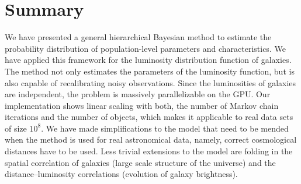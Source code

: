 \section{Summary}
\label{sec:summary} We have presented a general hierarchical Bayesian method to estimate the probability distribution of population-level parameters and characteristics.
We have applied this framework for the luminosity distribution function of galaxies.
The method not only estimates the parameters of the luminosity function, but is also capable of recalibrating noisy observations.
Since the luminosities of galaxies are independent, the problem is massively parallelizable on the GPU.
Our implementation shows linear scaling with both, the number of Markov chain iterations and the number of objects, which makes it applicable to real data sets of size $10^{8}$.
We have made simplifications to the model that need to be mended when the method is used for real astronomical data, namely, correct cosmological distances have to be used.
Less trivial extensions to the model are folding in the spatial correlation of galaxies (large scale structure of the universe) and the distance--luminosity correlations (evolution of galaxy brightness).
